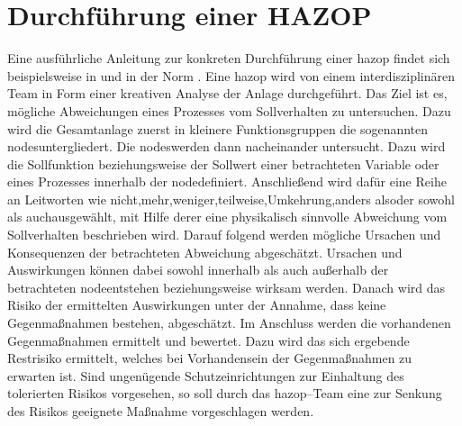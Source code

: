 \section{Durchf\"uhrung einer HAZOP}
Eine ausf\"uhrliche Anleitung zur konkreten Durchf\"uhrung einer \ac{hazop} findet sich beispielsweise in  \cite{Crawley_2015} und in der Norm  \cite{din61882}. \newline
Eine \ac{hazop} wird von einem interdisziplin\"aren Team in Form einer kreativen Analyse der Anlage durchgef\"uhrt. Das Ziel ist es, m\"ogliche Abweichungen eines Prozesses vom Sollverhalten zu untersuchen. Dazu wird die Gesamtanlage zuerst in kleinere Funktionsgruppen die sogenannten \glqq nodes\grqq { }untergliedert. Die \glqq nodes\grqq { }werden dann nacheinander untersucht. Dazu wird die Sollfunktion beziehungsweise der Sollwert einer betrachteten Variable oder eines Prozesses innerhalb der \glqq node\grqq { }definiert. Anschlie\ss{}end wird daf\"ur eine Reihe an Leitworten wie  nicht\grqq { },\glqq mehr\grqq { },\glqq weniger\grqq { },\glqq teilweise\grqq { },\glqq Umkehrung\grqq { },\glqq anders als\grqq { }oder \glqq sowohl als auch\grqq { }ausgew\"ahlt, mit Hilfe derer eine physikalisch sinnvolle Abweichung vom Sollverhalten beschrieben wird. Darauf folgend werden m\"ogliche Ursachen und Konsequenzen der betrachteten Abweichung abgesch\"atzt. Ursachen und Auswirkungen k\"onnen dabei sowohl innerhalb als auch au\ss{}erhalb der betrachteten \glqq node\grqq { }entstehen beziehungsweise wirksam werden. Danach wird das Risiko der ermittelten Auswirkungen unter der Annahme, dass keine Gegenma\ss{}nahmen bestehen, abgesch\"atzt. Im Anschluss werden die vorhandenen Gegenma\ss{}nahmen ermittelt und bewertet. Dazu wird das sich ergebende Restrisiko ermittelt, welches bei Vorhandensein der Gegenma\ss{}nahmen zu erwarten ist. Sind ungen\"ugende Schutzeinrichtungen zur Einhaltung des tolerierten Risikos vorgesehen, so soll durch das \ac{hazop}--Team eine zur Senkung des Risikos geeignete Ma\ss{}nahme vorgeschlagen werden. \newline
